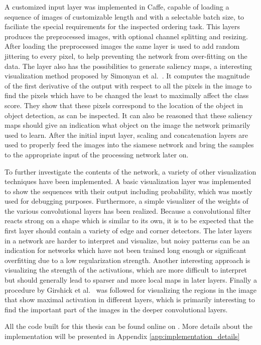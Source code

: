 A customized input layer was implemented in Caffe, capable of loading a sequence of images of customizable length and with a selectable batch size, to faciliate the special requirements for the inspected ordering task. This layers produces the preprocessed images, with optional channel splitting and resizing. After loading the preprocessed images the same layer is used to add random jittering to every pixel, to help preventing the network from over-fitting on the data. The layer also has the possibilities to generate saliency maps, a interesting visualization method proposed by Simonyan et al.~\cite{simonyan2013}. It computes the magnitude of the first derivative of the output with respect to all the pixels in the image to find the pixels which have to be changed the least to maximally affect the class score. They show that these pixels correspond to the location of the object in object detection, as can be inspected. It can also be reasoned that these saliency maps should give an indication what object on the image the network primarily used to learn. After the initial input layer, scaling and concatenation layers are used to properly feed the images into the siamese network and bring the samples to the appropriate input of the processing network later on.

To further investigate the contents of the network, a variety of other visualization techniques have been implemented. A basic visualization layer was implemented to show the sequences with their output including probability, which was mostly used for debugging purposes. Furthermore, a simple visualizer of the weights of the various convolutional layers has been realized. Because a convolutional filter reacts strong on a shape which is similar to its own, it is to be expected that the first layer should contain a variety of edge and corner detectors. The later layers in a network are harder to interpret and visualize, but noisy patterns can be an indication for networks which have not been trained long enough or significant overfitting due to a low regularization strength\needref. Another interesting approach is visualizing the strength of the activations, which are more difficult to interpret but should generally lead to sparser and more local maps in later layers. Finally a procedure by Girshick et al.~\cite{girshick2014} was followed for visualizing the regions in the image that show maximal activation in different layers, which is primarily interesting to find the important part of the images in the deeper convolutional layers.

All the code built for this thesis can be found online on \needref.  More details about the implementation will be presented in Appendix \ref{app:implementation_details}

